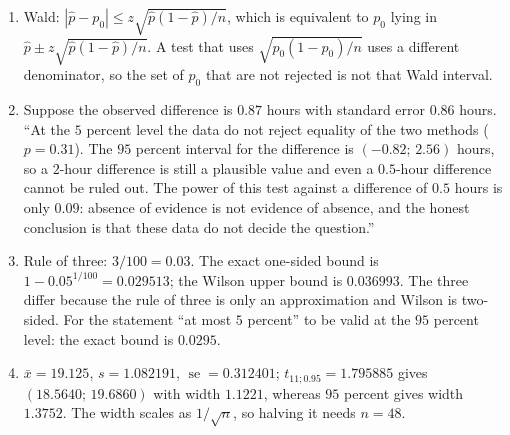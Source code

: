 \begin{enumerate}[label=\textbf{20.\arabic*}]
  \item Wald: $|\hat p-p_{0}|\le z\sqrt{\hat p(1-\hat p)/n}$, which is equivalent to
        $p_{0}$ lying in $\hat p\pm z\sqrt{\hat p(1-\hat p)/n}$. A test that uses
        $\sqrt{p_{0}(1-p_{0})/n}$ uses a different denominator, so the set of $p_{0}$
        that are not rejected is not that Wald interval.

  \item 
Suppose the observed difference is $0.87$ hours with standard error $0.86$ hours.
``At the $5$ percent level the data do not reject equality of the two methods
        ($p=0.31$). The $95$ percent interval for the difference is
        $(-0.82;\,2.56)$ hours, so a $2$-hour difference is still a plausible value
        and even a $0.5$-hour difference cannot be ruled out. The power of this test
        against a difference of $0.5$ hours is only $0.09$: absence of evidence is
        not evidence of absence, and the honest conclusion is that these data do not
        decide the question.''

  \item Rule of three: $3/100=0.03$. The exact one-sided bound is
        $1-0.05^{1/100}=0.029513$; the Wilson upper bound is $0.036993$. The three
        differ because the rule of three is only an approximation and Wilson is two-sided.
        For the statement ``at most $5$ percent'' to be valid at the $95$ percent level:
        the exact bound is $0.0295$.

  \item $\bar x=19.125$, $s=1.082191$, $\operatorname{se}=0.312401$;
        $t_{11;0.95}=1.795885$ gives $(18.5640;\,19.6860)$ with width
        $1.1221$, whereas $95$ percent gives width $1.3752$. The width scales as
        $1/\sqrt{n}$, so halving it needs $n=48$.
\end{enumerate}

